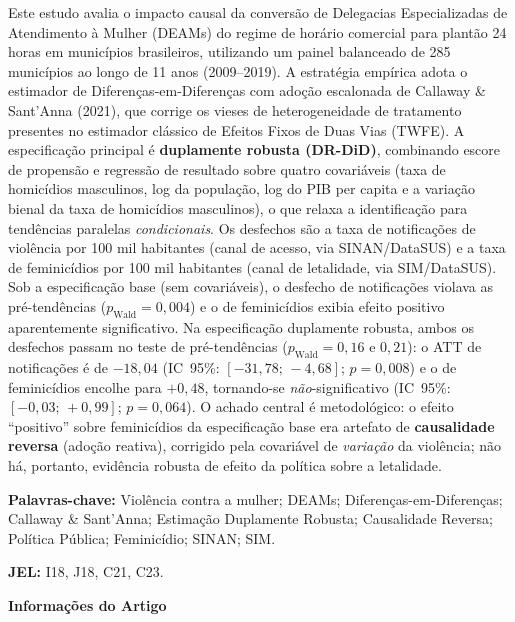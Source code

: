 \documentclass[twocolumn, 10pt]{article}
\begin{document}
{\begin{@twocolumnfalse}
\begin{minipage}[t]{0.48\textwidth}
    \vspace{4pt}
    \small
    Este estudo avalia o impacto causal da conversão de Delegacias Especializadas
    de Atendimento à Mulher (DEAMs) do regime de horário comercial para plantão
    24 horas em municípios brasileiros, utilizando um painel balanceado de
    285 municípios ao longo de 11 anos (2009--2019). A estratégia empírica
    adota o estimador de Diferenças-em-Diferenças com adoção escalonada de
    Callaway \& Sant'Anna (2021), que corrige os vieses de heterogeneidade de
    tratamento presentes no estimador clássico de Efeitos Fixos de Duas Vias
    (TWFE). A especificação principal é \textbf{duplamente robusta (DR-DiD)},
    combinando escore de propensão e regressão de resultado sobre quatro
    covariáveis (taxa de homicídios masculinos, log da população, log do PIB
    per capita e a variação bienal da taxa de homicídios masculinos), o que
    relaxa a identificação para tendências paralelas \textit{condicionais}.
    Os desfechos são a taxa de notificações de violência por 100 mil habitantes
    (canal de acesso, via SINAN/DataSUS) e a taxa de feminicídios por 100 mil
    habitantes (canal de letalidade, via SIM/DataSUS). Sob a especificação base
    (sem covariáveis), o desfecho de notificações violava as pré-tendências
    ($p_{\text{Wald}}=0{,}004$) e o de feminicídios exibia efeito positivo
    aparentemente significativo. Na especificação duplamente robusta, ambos os
    desfechos passam no teste de pré-tendências ($p_{\text{Wald}}=0{,}16$ e
    $0{,}21$): o ATT de notificações é de $-18{,}04$ (IC~95\%:
    $[-31{,}78;\,-4{,}68]$; $p=0{,}008$) e o de feminicídios encolhe para
    $+0{,}48$, tornando-se \textit{não}-significativo (IC~95\%:
    $[-0{,}03;\,+0{,}99]$; $p=0{,}064$). O achado central é metodológico: o
    efeito ``positivo'' sobre feminicídios da especificação base era artefato de
    \textbf{causalidade reversa} (adoção reativa), corrigido pela covariável de
    \textit{variação} da violência; não há, portanto, evidência robusta de
    efeito da política sobre a letalidade.

    \vspace{4pt}
    {\sffamily\bfseries\small Palavras-chave:} \small Violência contra a mulher;
    DEAMs; Diferenças-em-Diferenças; Callaway \& Sant'Anna; Estimação
    Duplamente Robusta; Causalidade Reversa; Política Pública;
    Feminicídio; SINAN; SIM.

    \vspace{4pt}
    {\sffamily\bfseries\small JEL:} \small I18, J18, C21, C23.
  \end{minipage}%
  \hfill
  \begin{minipage}[t]{0.48\textwidth}
    {\sffamily\bfseries\small Informações do Artigo}


\end{minipage}
\end{@twocolumnfalse}}
\end{document}
